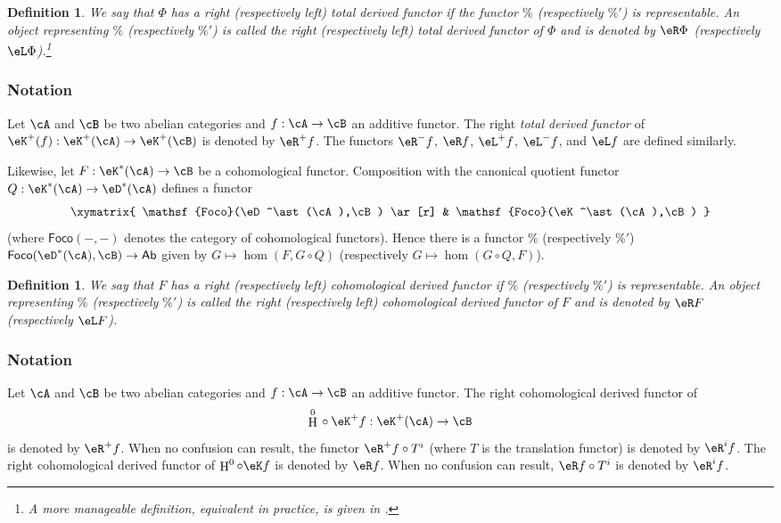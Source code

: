 \documentclass[12pt,oneside,english]{smfbook}
\DeclareMathOperator{\h}{H}
\newtheorem{definition}[subsubsection]{Definition}
\begin{document}
\begin{definition}\label{VIII:4-1-2}
We say that $\Phi$ has a right (respectively left) \emph{total derived functor} if the functor $\%$ (respectively $\%'$) is representable. An object representing $\%$ (respectively $\%'$) is called the right (respectively left) total derived functor of $\Phi$ and is denoted by $\eR\Phi$ (respectively $\eL\Phi$).\footnote{A more manageable definition, equivalent in practice, is given in \cite[XVII 1.2]{sga4}.}
\end{definition}

\subsubsection{Notation}\label{VIII:4-1-3}

Let $\cA$ and $\cB$ be two abelian categories and $f:\cA\to\cB$ an additive functor. The right \emph{total derived functor} of $\eK^+(f):\eK^+(\cA)\to\eK^+(\cB)$ is denoted by $\eR^+f$. The functors $\eR^-f$, $\eR f$, $\eL^+f$, $\eL^-f$, and $\eL f$ are defined similarly.

Likewise, let $F:\eK^\ast(\cA)\to\cB$ be a cohomological functor. Composition with the canonical quotient functor $Q:\eK^\ast(\cA)\to\eD^\ast(\cA)$ defines a functor
\[\xymatrix{
  \mathsf{Foco}(\eD^\ast(\cA),\cB) \ar[r]
    & \mathsf{Foco}(\eK^\ast(\cA),\cB)
}\]
(where $\mathsf{Foco}(-,-)$ denotes the category of cohomological functors). Hence there is a functor $\%$ (respectively $\%'$) $\mathsf{Foco}(\eD^\ast(\cA),\cB)\to\mathsf{Ab}$ given by $G\mapsto\hom(F,G\circ Q)$ (respectively $G\mapsto\hom(G\circ Q,F)$).

\begin{definition}\label{VIII:4-1-4}
We say that $F$ has a right (respectively left) \emph{cohomological derived functor} if $\%$ (respectively $\%'$) is representable. An object representing $\%$ (respectively $\%'$) is called the right (respectively left) cohomological derived functor of $F$ and is denoted by $\eR F$ (respectively $\eL F$).
\end{definition}

\subsubsection{Notation}\label{VIII:4-1-5}

Let $\cA$ and $\cB$ be two abelian categories and $f:\cA\to\cB$ an additive functor. The right cohomological derived functor of
\[
  \h^0{}\circ \eK^+ f:\eK^+(\cA) \to \cB
\]
is denoted by $\eR^+f$. When no confusion can result, the functor $\eR^+f\circ T^i$ (where $T$ is the translation functor) is denoted by $\eR^if$. The right cohomological derived functor of $\h^0\circ\eK f$ is denoted by $\eR f$. When no confusion can result, $\eR f\circ T^i$ is denoted by $\eR^if$.
\end{document}
